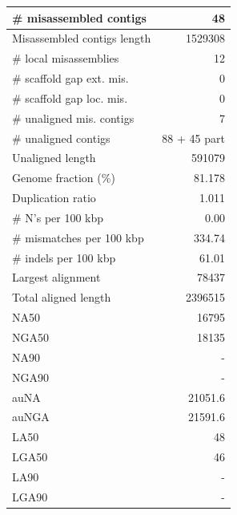 \documentclass[12pt,a4paper]{article}
\begin{document}
\begin{table}[ht]
\begin{center}
\begin{tabular}{|l*{1}{|r}|}
\# misassembled contigs & 48 \\ \hline
Misassembled contigs length & 1529308 \\ \hline
\# local misassemblies & 12 \\ \hline
\# scaffold gap ext. mis. & 0 \\ \hline
\# scaffold gap loc. mis. & 0 \\ \hline
\# unaligned mis. contigs & 7 \\ \hline
\# unaligned contigs & 88 + 45 part \\ \hline
Unaligned length & 591079 \\ \hline
Genome fraction (\%) & 81.178 \\ \hline
Duplication ratio & 1.011 \\ \hline
\# N's per 100 kbp & 0.00 \\ \hline
\# mismatches per 100 kbp & 334.74 \\ \hline
\# indels per 100 kbp & 61.01 \\ \hline
Largest alignment & 78437 \\ \hline
Total aligned length & 2396515 \\ \hline
NA50 & 16795 \\ \hline
NGA50 & 18135 \\ \hline
NA90 & - \\ \hline
NGA90 & - \\ \hline
auNA & 21051.6 \\ \hline
auNGA & 21591.6 \\ \hline
LA50 & 48 \\ \hline
LGA50 & 46 \\ \hline
LA90 & - \\ \hline
LGA90 & - \\ \hline
\end{tabular}
\end{center}
\end{table}
\end{document}
